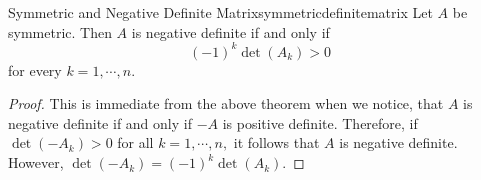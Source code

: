 \begin{corollary}{Symmetric and Negative Definite Matrix}{symmetricdefinitematrix} %
Let $A$ be symmetric. Then $A$ is negative definite if and only
if 
\begin{equation*}
\left( -1\right) ^{k} \det \left( A_{k}\right) >0
\end{equation*}
for every $k=1,\cdots ,n$.
\end{corollary}

\begin{proof}This is immediate from the above theorem when we notice,
that $A$ is negative definite if and only if $-A$ is positive definite.
Therefore, if $\det \left( -A_{k}\right) >0$ for all $k=1,\cdots ,n,$ it
follows that $A$ is negative definite. However, $\det \left( -A_{k}\right)
=\left( -1\right) ^{k}\det \left( A_{k}\right) .$ 
\end{proof}